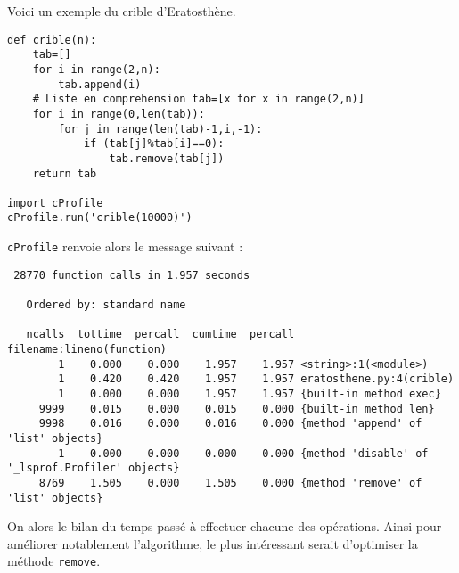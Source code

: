 \begin{exemple}

Voici un exemple du crible d'Eratosthène.

\begin{lstlisting}
def crible(n):
    tab=[] 
    for i in range(2,n):
        tab.append(i)
    # Liste en comprehension tab=[x for x in range(2,n)]
    for i in range(0,len(tab)):
        for j in range(len(tab)-1,i,-1):
            if (tab[j]%tab[i]==0):
                tab.remove(tab[j])
    return tab
    
import cProfile            
cProfile.run('crible(10000)')

\end{lstlisting}

\texttt{cProfile} renvoie alors le message suivant :


\begin{lstlisting}
 28770 function calls in 1.957 seconds

   Ordered by: standard name

   ncalls  tottime  percall  cumtime  percall filename:lineno(function)
        1    0.000    0.000    1.957    1.957 <string>:1(<module>)
        1    0.420    0.420    1.957    1.957 eratosthene.py:4(crible)
        1    0.000    0.000    1.957    1.957 {built-in method exec}
     9999    0.015    0.000    0.015    0.000 {built-in method len}
     9998    0.016    0.000    0.016    0.000 {method 'append' of 'list' objects}
        1    0.000    0.000    0.000    0.000 {method 'disable' of '_lsprof.Profiler' objects}
     8769    1.505    0.000    1.505    0.000 {method 'remove' of 'list' objects}

\end{lstlisting}


On alors le bilan du temps passé à effectuer chacune des opérations. Ainsi pour améliorer notablement l'algorithme, le plus intéressant serait d'optimiser la méthode \texttt{remove}.
\end{exemple}




\begin{thebibliography}{2}
\end{thebibliography}